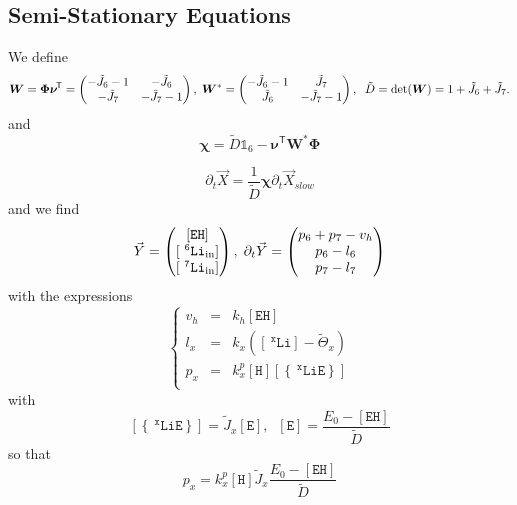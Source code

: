 \documentclass[aps,onecolumn,12pt]{revtex4}
\newcommand{\mychem}[1]{\mathtt{#1}}
\newcommand{\myconc}[1]{\left\lbrack{#1}\right\rbrack}
\newcommand{\spLi}[1]{{~^{\mychem{#1}}\mychem{Li}}}
\newcommand{\Li}[1]{\myconc{\spLi{#1}}}
\newcommand{\spEout}{\mychem{E}}
\newcommand{\Eout}{\myconc{\spEout}}
\newcommand{\spLiE}[1]{\left\lbrace\spLi{#1}\spEout\right\rbrace}
\newcommand{\LiE}[1]{\myconc{\spLiE{#1}}}
\newcommand{\spLiIn}[1]{{\spLi{#1}}_{\mathrm{in}}}
\newcommand{\LiIn}[1]{\myconc{\spLiIn{#1}}}
\newcommand{\spEHin}{\mychem{EH}}
\newcommand{\EHin}{\myconc{\spEHin}}
\newcommand{\spproton}{\mychem{H}}
\newcommand{\proton}{\myconc{\spproton}}
\newcommand{\mytrn}[1]{{#1}^{\!\mathsf{T}}}
\newcommand{\mymat}[1]{{\bm{#1}}}
\begin{document}
\subsection{Semi-Stationary Equations}
We define
\begin{equation}
	\mymat{W} = \mymat{\Phi}\mytrn{\mymat{\nu}} = \begin{pmatrix} -\tilde{J}_6-1 & -\tilde{J}_6 \cr -\tilde{J}_7 & -\tilde{J}_7-1\end{pmatrix}
	,\;\mymat{W}^\ast = \begin{pmatrix} -\tilde{J}_6-1 & \tilde{J}_7 \cr \tilde{J}_6 & -\tilde{J}_7-1\end{pmatrix}
	,\;\; \tilde{D} =\det(\mymat{W})=1+\tilde{J}_6+\tilde{J}_7.
\end{equation}
and
\begin{equation}
	\mymat{\chi} = \tilde{D}\mathds{1}_6-\mytrn{\mymat{\nu}}\mymat{W}^\ast\mymat{\Phi}
\end{equation}

\begin{equation}
	\partial_t\vec{X} = \dfrac{1}{\tilde{D}}
	\mymat{\chi} \partial_t\vec{X}_{slow}
\end{equation}
and we find
\begin{equation}
	\vec{Y} = \begin{pmatrix} \EHin \cr \LiIn{6} \cr \LiIn{7} \end{pmatrix}
	,\;\partial_t \vec{Y} = 
	\begin{pmatrix}
	p_6+p_7-v_h\\
	p_6-l_6\\
	p_7-l_7
	\end{pmatrix}
\end{equation}
with the expressions
\begin{equation}
\left\lbrace
	\begin{array}{rcl}
	v_h & = & k_h \EHin \\
	l_x & = & k_x  \left(\Li{x}- \tilde{\Theta}_x\right)\\
	p_x & = & k_x^p \proton \LiE{x}\\
	\end{array}
\right.
\end{equation}
with
\begin{equation}
	\LiE{x} = \tilde{J}_x \Eout,\;\;\Eout=\dfrac{E_0-\EHin}{\tilde{D}}
\end{equation}
so that
\begin{equation}
	p_x = k_x^p \proton  \tilde{J}_x \dfrac{E_0-\EHin}{\tilde{D}}
\end{equation}
\end{document}

